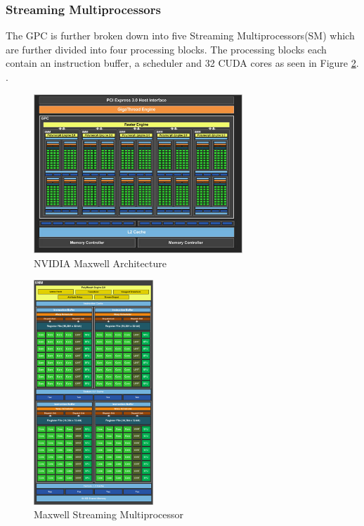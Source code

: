 \subsubsection{Streaming Multiprocessors}\label{gpu:ssec:smm}
The GPC is further broken down into five Streaming Multiprocessors(SM) which are further divided into four processing blocks. The processing blocks each contain an instruction buffer, a scheduler and 32 CUDA cores as seen in Figure \ref{gpu:img:smm}. \cite{GM107SMM}.
%
\begin{figure}[H]
 \centering
 \includegraphics[width=0.7\textwidth]{Images/GM107.jpg}
 \caption{NVIDIA Maxwell Architecture\cite{GM107}}
 \label{gpu:img:gm107}
\end{figure}
%
\begin{figure}[H]
\centering
 \includegraphics[width=0.4\textwidth]{Images/GM107SMM.png}
 \caption{Maxwell Streaming Multiprocessor\cite{GM107SMM}}
 \label{gpu:img:smm}
\end{figure}
